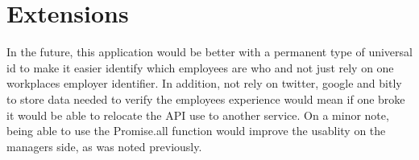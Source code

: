 \documentclass[12pt]{article}
\begin{document}
\section{Extensions}

In the future, this application would be better with a permanent type of universal id to make it easier identify which
employees are who and not just rely on one workplaces employer identifier. In addition, not rely on twitter, google and
bitly to store data needed to verify the employees experience would mean if one broke it would be able to relocate the
API use to another service. On a minor note, being able to use the Promise.all function would improve the usablity on
the managers side, as was noted previously.



\newpage
\end{document}
